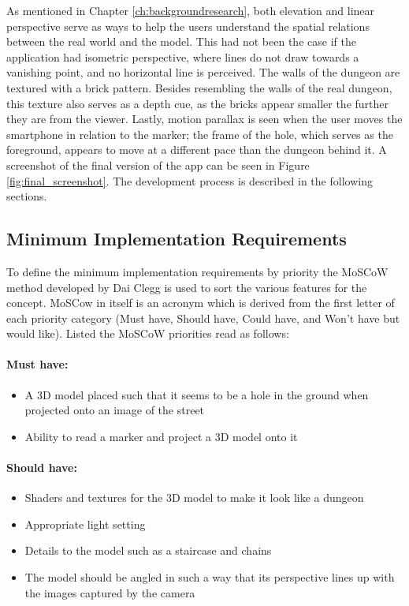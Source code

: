 As mentioned in Chapter \ref{ch:backgroundresearch}, both elevation and linear perspective serve as ways to help the users understand the spatial relations between the real world and the model. This had not been the case if the application had isometric perspective, where lines do not draw towards a vanishing point, and no horizontal line is perceived. The walls of the dungeon are textured with a brick pattern. Besides resembling the walls of the real dungeon, this texture also serves as a depth cue, as the bricks appear smaller the further they are from the viewer. Lastly, motion parallax is seen when the user moves the smartphone in relation to the marker; the frame of the hole, which serves as the foreground, appears to move at a different pace than the dungeon behind it.
A screenshot of the final version of the app can be seen in Figure \ref{fig:final_screenshot}. The development process is described in the following sections.

\subsection{Minimum Implementation Requirements}
To define the minimum implementation requirements by priority the MoSCoW method developed by Dai Clegg \cite{Kuhn2009} is used to sort the various features for the concept. MoSCow in itself is an acronym which is derived from the first letter of each priority category (Must have, Should have, Could have, and Won’t have but would like). Listed the MoSCoW priorities read as follows:

\paragraph{Must have:}
\begin{itemize}
\item A 3D model placed such that it seems to be a hole in the ground when projected onto an image of the street
\item Ability to read a marker and project a 3D model onto it
\end{itemize}

\paragraph{Should have:}
\begin{itemize}
\item Shaders and textures for the 3D model to make it look like a dungeon
\item Appropriate light setting
\item Details to the model such as a staircase and chains
\item The model should be angled in such a way that its perspective lines up with the images captured by the camera
\end{itemize}

